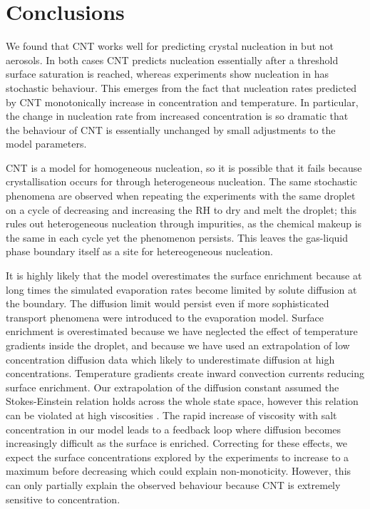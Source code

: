 \documentclass[11pt,twoside]{report}
\begin{document}
\section{Conclusions}

We found that CNT works well for predicting crystal nucleation in  but not  aerosols.
In both cases CNT predicts nucleation essentially after a threshold surface saturation is reached, whereas experiments show nucleation in  has stochastic behaviour.
This emerges from the fact that nucleation rates predicted by CNT monotonically increase in concentration and temperature.
In particular, the change in nucleation rate from increased concentration is so dramatic that the behaviour of CNT is essentially unchanged by small adjustments to the model parameters.

CNT is a model for homogeneous nucleation, so it is possible that it fails because crystallisation occurs for  through heterogeneous nucleation.
The same stochastic phenomena are observed when repeating the experiments with the same droplet on a cycle of decreasing and increasing the RH to dry and melt the droplet; this rules out heterogeneous nucleation through impurities, as the chemical makeup is the same in each cycle yet the phenomenon persists.
This leaves the gas-liquid phase boundary itself as a site for hetereogeneous nucleation.

It is highly likely that the model overestimates the surface enrichment because at long times the simulated evaporation rates become limited by solute diffusion at the boundary.
The diffusion limit would persist even if more sophisticated transport phenomena were introduced to the evaporation model.
Surface enrichment is overestimated because we have neglected the effect of temperature gradients inside the droplet, and because we have used an extrapolation of low concentration diffusion data which likely to underestimate diffusion at high concentrations.
Temperature gradients create inward convection currents reducing surface enrichment.
Our extrapolation of the diffusion constant assumed the Stokes-Einstein relation holds across the whole state space, however this relation can be violated at high viscosities \cite{BerthierRMP2011}.
The rapid increase of viscosity with salt concentration in our model leads to a feedback loop where diffusion becomes increasingly difficult as the surface is enriched.
Correcting for these effects, we expect the surface concentrations explored by the experiments to increase to a maximum before decreasing which could explain non-monoticity.
However, this can only partially explain the observed behaviour because CNT is extremely sensitive to concentration.
\end{document}

